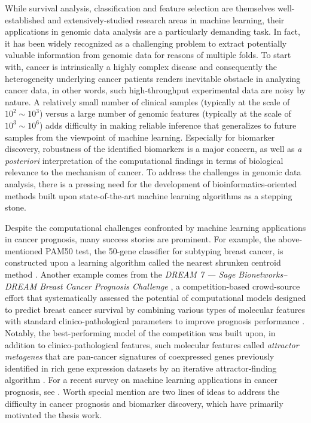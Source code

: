 While survival analysis, classification and feature selection are themselves well-established and extensively-studied research areas in machine learning, their applications in genomic data analysis are a particularly demanding task. In fact, it has been widely recognized as a challenging problem to extract potentially valuable information from genomic data for reasons of multiple folds. To start with, cancer is intrinsically a highly complex disease and consequently the heterogeneity underlying cancer patients renders inevitable obstacle in analyzing cancer data, in other words, such high-throughput experimental data are noisy by nature. A relatively small number of clinical samples (typically at the scale of $10^2 \sim 10^3$) versus a large number of genomic features (typically at the scale of $10^3 \sim 10^6$) adds difficulty in making reliable inference that generalizes to future samples from the viewpoint of machine learning. Especially for biomarker discovery, robustness of the identified biomarkers is a major concern, as well as \textit{a posteriori} interpretation of the computational findings in terms of biological relevance to the mechanism of cancer. To address the challenges in genomic data analysis, there is a pressing need for the development of bioinformatics-oriented methods built upon state-of-the-art machine learning algorithms as a stepping stone.


Despite the computational challenges confronted by machine learning applications in cancer prognosis, many success stories are prominent. For example, the above-mentioned PAM50 test, the 50-gene classifier for subtyping breast cancer, is constructed upon a learning algorithm called the nearest shrunken centroid method \cite{Tibshirani2002Diagnosis}. Another example comes from the \textit{DREAM 7 --- Sage Bionetworks--DREAM Breast Cancer Prognosis Challenge} \cite{Margolin2013Systematic}, a competition-based crowd-source effort that systematically assessed the potential of computational models designed to predict breast cancer survival by combining various types of molecular features with standard clinico-pathological parameters to improve prognosis performance \cite{Bilal2013Improving}. Notably, the best-performing model of the competition \cite{Cheng2013Development} was built upon, in addition to clinico-pathological features, such molecular features called \textit{attractor metagenes} that are pan-cancer signatures of coexpressed genes previously identified in rich gene expression datasets by an iterative attractor-finding algorithm \cite{Cheng2013Biomolecular}. For a recent survey on machine learning applications in cancer prognosis, see \cite{Kourou2015Machine}. Worth special mention are two lines of ideas to address the difficulty in cancer prognosis and biomarker discovery, which have primarily motivated the thesis work.


